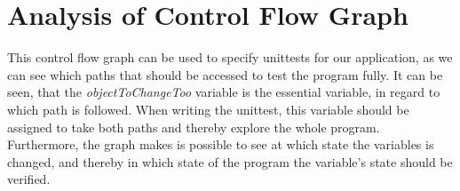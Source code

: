 \section{Analysis of Control Flow Graph}
This control flow graph can be used to specify unittests for our application, as we can see which paths that should be accessed to test the program fully. It can be seen, that the \textit{objectToChangeToo} variable is the essential variable, in regard to which path is followed. When writing the unittest, this variable should be assigned to take both paths and thereby explore the whole program.
Furthermore, the graph makes is possible to see at which state the variables is changed, and thereby in which state of the program the variable's state should be verified.